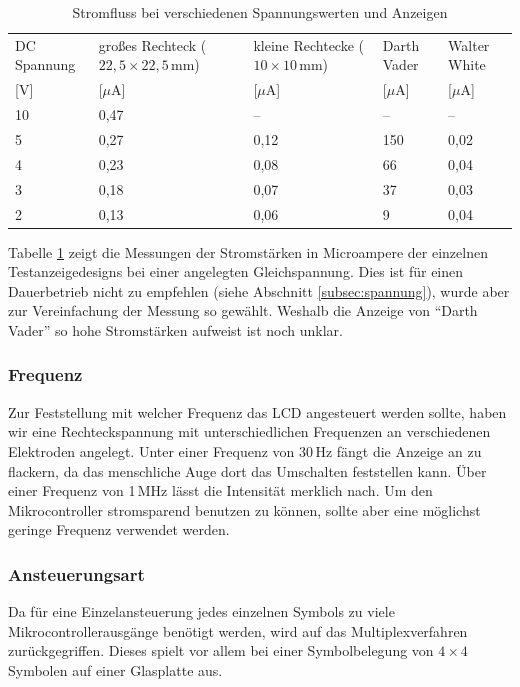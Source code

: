\begin{table}[]
	\centering
	\caption{Stromfluss bei verschiedenen Spannungswerten und Anzeigen}
	\label{my-label}
	\begin{tabular}{p{1.2cm}|p{1.2cm}|p{1.2cm}|p{1.2cm}|p{1.2cm}}
		DC Spannung & großes Rechteck (\(22,5\times22,5\,\textrm{mm}\)) & kleine Rechtecke (\(10\times10\,\textrm{mm}\)) & Darth Vader & Walter White    \\
        {[}V{]} & {[}$\mu$A{]} & {[}$\mu$A{]} & {[}$\mu$A{]} & {[}$\mu$A{]} \\
         \hline
		10 & 0,47 & -- & --  & --   \\ \hline
		5  & 0,27 & 0,12 & 150 & 0,02 \\ \hline
		4  & 0,23 & 0,08 & 66  & 0,04 \\ \hline
		3  & 0,18 & 0,07 & 37  & 0,03 \\ \hline
		2  & 0,13 & 0,06 & 9   & 0,04 \\
	\end{tabular}
	\label{tab:volt}
\end{table}

Tabelle \ref{tab:volt} zeigt die Messungen der Stromstärken in Microampere der einzelnen Testanzeigedesigns bei einer angelegten Gleichspannung. Dies ist für einen Dauerbetrieb nicht zu empfehlen (siehe Abschnitt \ref{subsec:spannung}), wurde aber zur Vereinfachung der Messung so gewählt. Weshalb die Anzeige von “Darth Vader” so hohe Stromstärken aufweist ist noch unklar.

\subsubsection{Frequenz}
Zur Feststellung mit welcher Frequenz das LCD angesteuert werden sollte, haben wir eine Rechteckspannung mit unterschiedlichen Frequenzen an verschiedenen Elektroden angelegt. Unter einer Frequenz von 30\,Hz fängt die Anzeige an zu flackern, da das menschliche Auge dort das Umschalten feststellen kann. Über einer Frequenz von 1\,MHz lässt die Intensität merklich nach. Um den Mikrocontroller stromsparend benutzen zu können, sollte aber eine möglichst geringe Frequenz verwendet werden.

\subsubsection{Ansteuerungsart}
Da für eine Einzelansteuerung jedes einzelnen Symbols zu viele Mikrocontrollerausgänge benötigt werden, wird auf das Multiplexverfahren zurückgegriffen. Dieses spielt vor allem bei einer Symbolbelegung von \(4\times4\) Symbolen auf einer Glasplatte aus.

